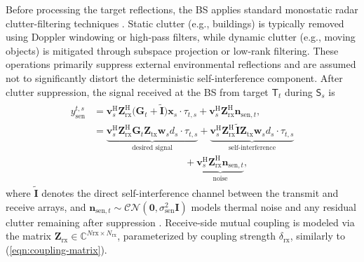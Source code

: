 \documentclass[10pt,journal,compsoc]{IEEEtran}
\theoremstyle{myremark}
\theoremstyle{myexample}
\begin{document}
Before processing the target reflections, the BS applies standard monostatic radar clutter-filtering techniques \cite{skolnik2001:introduction-radar-systems, richards2005:fundamentals-radar-signal-processing, cao2020:clutter-suppression-target-tracking-low-rank-representation-airborne-maritime-surveillance-radar}.
Static clutter (e.g., buildings) is typically removed using Doppler windowing or high-pass filters, while dynamic clutter (e.g., moving objects) is mitigated through subspace projection or low-rank filtering. These operations primarily suppress external environmental reflections and are assumed not to significantly distort the deterministic self-interference component. After clutter suppression, the signal received at the \gls{BS} from target $ \mathsf{T}_t $ during $ \mathsf{S}_s $ is 
\begin{align} \label{eqn:signal-received-bs}
	\begin{aligned}
	y_\mathrm{sen}^{t,s} & = \mathbf{v}_s^\mathrm{H} \mathbf{Z}_\mathrm{rx}^\mathrm{H} \big( \mathbf{G}_t + \tilde{\mathbf{I}} \big) \mathbf{x}_s \cdot \tau_{t,s} + \mathbf{v}_s^\mathrm{H} \mathbf{Z}_\mathrm{rx}^\mathrm{H} \mathbf{n}_{\mathrm{sen},t},
	\\
	& = \underbrace{\mathbf{v}_s^\mathrm{H} \mathbf{Z}_\mathrm{rx}^\mathrm{H} \mathbf{G}_t \mathbf{Z}_\mathrm{tx} \mathbf{w}_s d_s \cdot \tau_{t,s}}_\text{desired signal} 
	+ \underbrace{\mathbf{v}_s^\mathrm{H} \mathbf{Z}_\mathrm{rx}^\mathrm{H} \tilde{\mathbf{I}} \mathbf{Z}_\mathrm{tx} \mathbf{w}_s d_s \cdot \tau_{t,s}}_\text{self-interference}
	\\
	& ~~~~~~~~~~~~~~~~~~~~~~~~~~~~~~~~~~~~~~~~~~ + \underbrace{\mathbf{v}_s^\mathrm{H} \mathbf{Z}_\mathrm{rx}^\mathrm{H} \mathbf{n}_{\mathrm{sen},t}}_\text{noise},
	\end{aligned}
\end{align}
where $ \tilde{\mathbf{I}} $ denotes the direct self-interference channel between the transmit and receive arrays, and $ \mathbf{n}_{\mathrm{sen},t} \sim \mathcal{CN} \left( \mathbf{0}, \sigma_\mathrm{sen}^2 \mathbf{I} \right) $ models thermal noise and any residual clutter remaining after suppression \cite{skolnik2001:introduction-radar-systems, richards2005:fundamentals-radar-signal-processing}. Receive-side mutual coupling is modeled via the matrix $ \mathbf{Z}_\mathrm{rx} \in \mathbb{C}^{N\mathrm{rx} \times N_\mathrm{rx}} $, parameterized by coupling strength $ \delta_\mathrm{rx} $, similarly to (\ref{eqn:coupling-matrix}).
\end{document}
